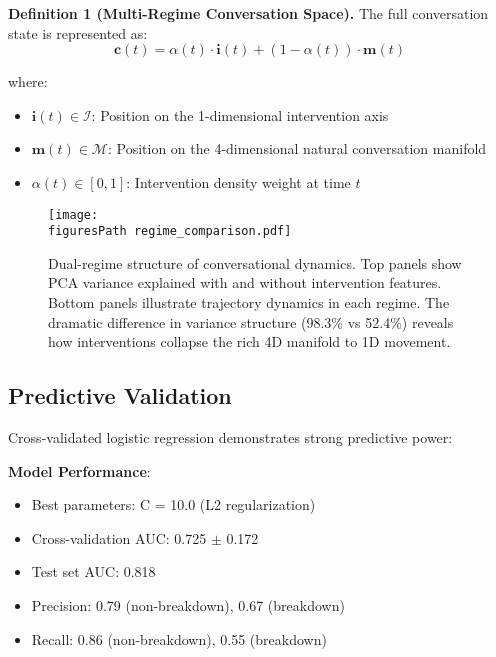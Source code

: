 \documentclass[11pt,letterpaper]{article}
\newcommand{\allFeaturesPCOne}{98.3\%}  %
\newcommand{\nonInterventionPCOneVariance}{52.4\%}  %
\newcommand{\bestRegularizationC}{10.0}
\newcommand{\cvAUCMean}{0.725}
\newcommand{\cvAUCStd}{0.172}
\newcommand{\testAUC}{0.818}
\newcommand{\precisionNonBreakdown}{0.79}
\newcommand{\precisionBreakdown}{0.67}
\newcommand{\recallNonBreakdown}{0.86}
\newcommand{\recallBreakdown}{0.55}
\newcommand{\figuresPath}{../analysis/rigorous_analysis_outputs/figures/}
\begin{document}
\textbf{Definition 1 (Multi-Regime Conversation Space).} The full conversation state is represented as:
\begin{equation}
\mathbf{c}(t) = \alpha(t) \cdot \mathbf{i}(t) + (1-\alpha(t)) \cdot \mathbf{m}(t)
\end{equation}

where:
\begin{itemize}
    \item $\mathbf{i}(t) \in \mathcal{I}$: Position on the 1-dimensional intervention axis
    \item $\mathbf{m}(t) \in \mathcal{M}$: Position on the 4-dimensional natural conversation manifold
    \item $\alpha(t) \in [0,1]$: Intervention density weight at time $t$
\end{itemize}

\begin{figure}[htbp]
\centering
\texttt{[image: \\figuresPath regime\_comparison.pdf]}
\caption{Dual-regime structure of conversational dynamics. Top panels show PCA variance explained with and without intervention features. Bottom panels illustrate trajectory dynamics in each regime. The dramatic difference in variance structure (\allFeaturesPCOne{} vs \nonInterventionPCOneVariance{}) reveals how interventions collapse the rich 4D manifold to 1D movement.}
\label{fig:regime_comparison}
\end{figure}

\subsection{Predictive Validation}

Cross-validated logistic regression demonstrates strong predictive power:

\textbf{Model Performance}:
\begin{itemize}
    \item Best parameters: C = \bestRegularizationC{} (L2 regularization)
    \item Cross-validation AUC: \cvAUCMean{} $\pm$ \cvAUCStd{}
    \item Test set AUC: \testAUC{}
    \item Precision: \precisionNonBreakdown{} (non-breakdown), \precisionBreakdown{} (breakdown)
    \item Recall: \recallNonBreakdown{} (non-breakdown), \recallBreakdown{} (breakdown)
\end{itemize}
\end{document}
